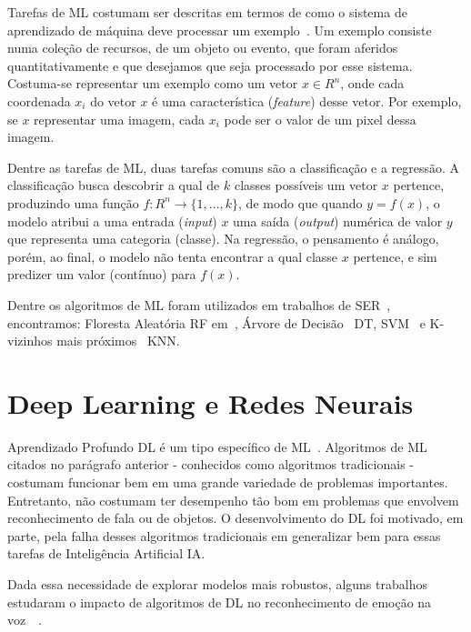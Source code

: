 Tarefas de \acrshort{ML} costumam ser descritas em termos de como o sistema de aprendizado de máquina deve processar um exemplo~\cite{53}. Um exemplo consiste numa coleção de recursos, de um objeto ou evento, que foram aferidos quantitativamente e que desejamos que seja processado por esse sistema. Costuma-se representar um exemplo como um vetor $x \in R^n$, onde cada coordenada $x_i$ do vetor $x$ é uma característica (\textit{feature}) desse vetor. Por exemplo, se $x$ representar uma imagem, cada $x_i$ pode ser o valor de um pixel dessa imagem.

Dentre as tarefas de \acrshort{ML}, duas tarefas comuns são a classificação e a regressão. A classificação busca descobrir a qual de $k$ classes possíveis um vetor $x$ pertence, produzindo uma função $f: R^n \rightarrow \{1, ..., k\}$, de modo que quando $y = f(x)$, o modelo atribui a uma entrada (\textit{input}) $x$ uma saída (\textit{output}) numérica de valor $y$ que representa uma categoria (classe). Na regressão, o pensamento é análogo, porém, ao final, o modelo não tenta encontrar a qual classe $x$ pertence, e sim predizer um valor (contínuo) para $f(x)$.

Dentre os algoritmos de \acrshort{ML} foram utilizados em trabalhos de SER~\cite{20.7}, encontramos: Floresta Aleatória \acrfull{RF} em~\cite{20.10}, Árvore de Decisão~\cite{20.11} \acrlong{DT}, \acrshort{SVM}~\cite{20.13} e K-vizinhos mais próximos~\cite{20.15} \acrlong{KNN}.%

\section{Deep Learning e Redes Neurais}\label{sec:dl}

Aprendizado Profundo \acrshort{DL} é um tipo específico de \acrshort{ML}~\cite{53}. Algoritmos de \acrshort{ML} citados no parágrafo anterior - conhecidos como algoritmos tradicionais - costumam funcionar bem em uma grande variedade de problemas importantes. Entretanto, não costumam ter desempenho tão bom em problemas que envolvem reconhecimento de fala ou de objetos. O desenvolvimento do \acrshort{DL} foi motivado, em parte, pela falha desses algoritmos tradicionais em generalizar bem para essas tarefas de Inteligência Artificial \acrlong{IA}.

Dada essa necessidade de explorar modelos mais robustos, alguns trabalhos estudaram o impacto de algoritmos de \acrshort{DL} no reconhecimento de emoção na voz~\cite{12.12}~\cite{12.16}.

